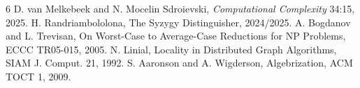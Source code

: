 \documentclass[11pt]{article}
\begin{document}
\begin{thebibliography}{6}
 D. van Melkebeek and N. Mocelin Sdroievski, \emph{Computational Complexity} 34:15, 2025.
 H. Randriambololona, The Syzygy Distinguisher, 2024/2025.
 A. Bogdanov and L. Trevisan, On Worst-Case to Average-Case Reductions for NP Problems, ECCC TR05-015, 2005.
 N. Linial, Locality in Distributed Graph Algorithms, SIAM J. Comput. 21, 1992.
 S. Aaronson and A. Wigderson, Algebrization, ACM TOCT 1, 2009.
\end{thebibliography}
\end{document}
